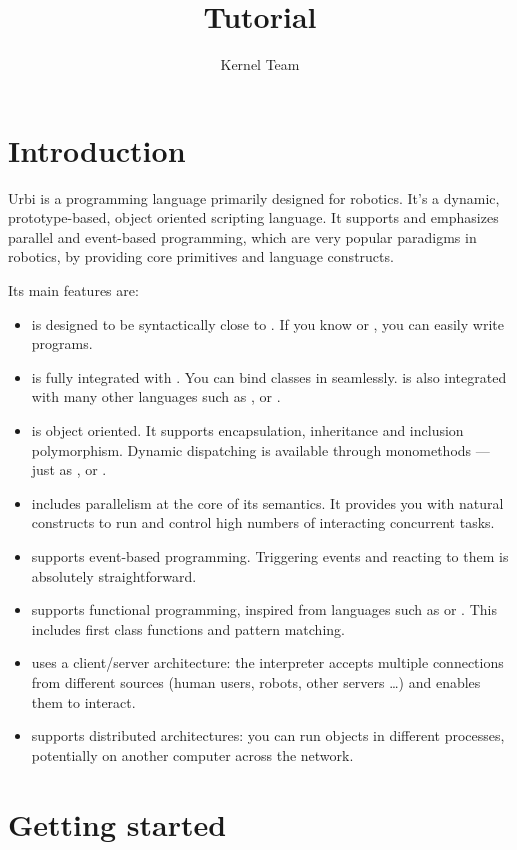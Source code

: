 \documentclass[openright,twoside,12pt]{report}
\title{Tutorial}
\author{Kernel Team}
\begin{document}
\maketitle
\tableofcontents
\chapter{Introduction}

Urbi is a programming language primarily designed for robotics. It's a
dynamic, prototype-based, object oriented scripting language. It
supports and emphasizes parallel and event-based programming, which
are very popular paradigms in robotics, by providing core primitives
and language constructs.

Its main features are:
\begin{itemize}
\item \urbi is designed to be syntactically close to \Cxx. If you know
  \C or \Cxx, you can easily write \urbi programs.
\item \urbi is fully integrated with \Cxx. You can bind \Cxx classes
  in \urbi seamlessly. \urbi is also integrated with many other
  languages such as \java, \matlab or \python.
\item \urbi is object oriented. It supports encapsulation, inheritance
  and inclusion polymorphism. Dynamic dispatching is available through
  monomethods --- just as \Cxx, \Cs or \java.
\item \urbi includes parallelism at the core of its semantics. It
  provides you with natural constructs to run and control high numbers
  of interacting concurrent tasks.
\item \urbi supports event-based programming. Triggering events and
  reacting to them is absolutely straightforward.
\item \urbi supports functional programming, inspired from languages
  such as \lisp or \caml. This includes first class functions and
  pattern matching.
\item \urbi uses a client/server architecture: the interpreter accepts
  multiple connections from different sources (human users, robots,
  other servers \ldots) and enables them to interact.
\item \urbi supports distributed architectures: you can run objects in
  different processes, potentially on another computer across the
  network.
\end{itemize}

\chapter{Getting started}
\end{document}
